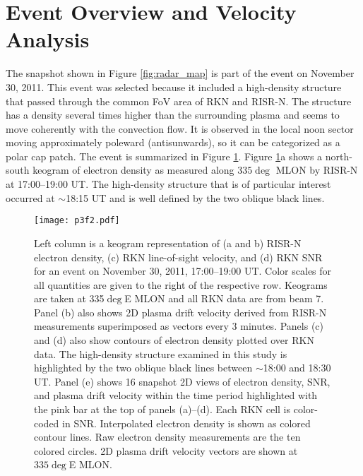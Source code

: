 \section{Event Overview and Velocity Analysis}
The snapshot shown in Figure \ref{fig:radar_map} is part of the event on November 30, 2011.  This event was selected because it included a high-density structure that passed through the common FoV area of RKN and RISR-N.  The structure has a density several times higher than the surrounding plasma and seems to move coherently with the convection flow.  It is observed in the local noon sector moving approximately poleward (antisunwards), so it can be categorized as a polar cap patch. The event is summarized in Figure \ref{fig:event_overview}.  Figure \ref{fig:event_overview}a shows a north-south keogram of electron density as measured along \(335\deg\) MLON by RISR-N at 17:00--19:00 UT.  The high-density structure that is of particular interest occurred at \(\sim\)18:15 UT and is well defined by the two oblique black lines.

\begin{figure}
	\texttt{[image: p3f2.pdf]}
  \caption[Polar Patch Event Overview]{Left column is a keogram representation of (a and b) RISR-N electron density, (c) RKN line-of-sight velocity, and (d) RKN SNR for an event on November 30, 2011, 17:00--19:00 UT.  Color scales for all quantities are given to the right of the respective row. Keograms are taken at 335\(\deg\)E MLON and all RKN data are from beam 7.  Panel (b) also shows 2D plasma drift velocity derived from RISR-N measurements superimposed as vectors every 3 minutes.  Panels (c) and (d) also show contours of electron density plotted over RKN data. The high-density structure examined in this study is highlighted by the two oblique black lines between \(\sim\)18:00 and 18:30 UT. Panel (e) shows 16 snapshot 2D views of electron density, SNR, and plasma drift velocity within the time period highlighted with the pink bar at the top of panels (a)--(d).  Each RKN cell is color-coded in SNR. Interpolated electron density is shown as colored contour lines. Raw electron density measurements are the ten colored circles.  2D plasma drift velocity vectors are shown at \(335\deg\)E MLON.}
  \label{fig:event_overview}
\end{figure}

